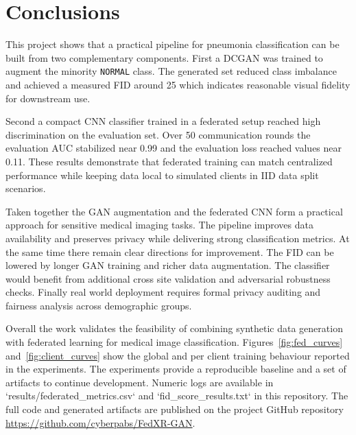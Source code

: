 \section{Conclusions}
\label{sec:conclusions}

This project shows that a practical pipeline for pneumonia
classification can be built from two complementary components. First a
DCGAN \cite{Radford2015DCGAN} was trained to augment the minority
\texttt{NORMAL} class. The generated set reduced class imbalance and
achieved a measured FID around 25 \cite{Heusel2017FID} which indicates
reasonable visual fidelity for downstream use.

Second a compact CNN classifier trained in a federated setup
\cite{McMahan2017FedAvg} reached high discrimination on the evaluation
set. Over 50 communication rounds the evaluation AUC stabilized near
0.99 and the evaluation loss reached values near 0.11. These results
demonstrate that federated training can match centralized performance
while keeping data local to simulated clients in IID data split
scenarios. 

Taken together the GAN augmentation and the federated CNN form a practical approach for sensitive medical imaging tasks. The pipeline improves data availability and preserves privacy while delivering strong classification metrics. At the same time there remain clear directions for improvement. The FID can be lowered by longer GAN training and richer data augmentation. The classifier would benefit from additional cross site validation and adversarial robustness checks. Finally real world deployment requires formal privacy auditing and fairness analysis across demographic groups.

Overall the work validates the feasibility of combining synthetic data generation with federated learning for medical image classification. Figures~\ref{fig:fed_curves} and~\ref{fig:client_curves} show the global and per client training behaviour reported in the experiments. The experiments provide a reproducible baseline and a set of artifacts to continue development. Numeric logs are available in `results/federated\_metrics.csv` and `fid\_score\_results.txt` in this repository. The full code and generated artifacts are published on the project GitHub repository \url{https://github.com/cyberpabs/FedXR-GAN}.
